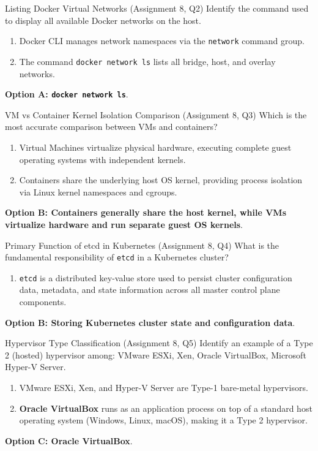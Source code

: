 \begin{solved}{Listing Docker Virtual Networks (Assignment 8, Q2)}
\Given Identify the command used to display all available Docker networks on the host.
\Steps
\begin{enumerate}[leftmargin=*]
  \item Docker CLI manages network namespaces via the \texttt{network} command group.
  \item The command \texttt{docker network ls} lists all bridge, host, and overlay networks.
\end{enumerate}
\Answer \textbf{Option A: \texttt{docker network ls}}.
\end{solved}

\begin{solved}{VM vs Container Kernel Isolation Comparison (Assignment 8, Q3)}
\Given Which is the most accurate comparison between VMs and containers?
\Steps
\begin{enumerate}[leftmargin=*]
  \item Virtual Machines virtualize physical hardware, executing complete guest operating systems with independent kernels.
  \item Containers share the underlying host OS kernel, providing process isolation via Linux kernel namespaces and cgroups.
\end{enumerate}
\Answer \textbf{Option B: Containers generally share the host kernel, while VMs virtualize hardware and run separate guest OS kernels}.
\end{solved}

\begin{solved}{Primary Function of etcd in Kubernetes (Assignment 8, Q4)}
\Given What is the fundamental responsibility of \texttt{etcd} in a Kubernetes cluster?
\Steps
\begin{enumerate}[leftmargin=*]
  \item \texttt{etcd} is a distributed key-value store used to persist cluster configuration data, metadata, and state information across all master control plane components.
\end{enumerate}
\Answer \textbf{Option B: Storing Kubernetes cluster state and configuration data}.
\end{solved}

\begin{solved}{Hypervisor Type Classification (Assignment 8, Q5)}
\Given Identify an example of a Type 2 (hosted) hypervisor among: VMware ESXi, Xen, Oracle VirtualBox, Microsoft Hyper-V Server.
\Steps
\begin{enumerate}[leftmargin=*]
  \item VMware ESXi, Xen, and Hyper-V Server are Type-1 bare-metal hypervisors.
  \item \textbf{Oracle VirtualBox} runs as an application process on top of a standard host operating system (Windows, Linux, macOS), making it a Type 2 hypervisor.
\end{enumerate}
\Answer \textbf{Option C: Oracle VirtualBox}.
\end{solved}

